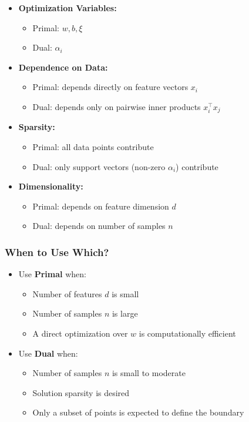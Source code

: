 \documentclass[10pt,a4paper]{article}
\begin{document}
		\begin{itemize}
			\item \textbf{Optimization Variables:}
			\begin{itemize}
				\item Primal: $w, b, \xi$
				\item Dual: $\alpha_i$
			\end{itemize}
	
			\item \textbf{Dependence on Data:}
			\begin{itemize}
				\item Primal: depends directly on feature vectors $x_i$
				\item Dual: depends only on pairwise inner products $x_i^\top x_j$
			\end{itemize}
	
			\item \textbf{Sparsity:}
			\begin{itemize}
				\item Primal: all data points contribute
				\item Dual: only support vectors (non-zero $\alpha_i$) contribute
			\end{itemize}
	
			\item \textbf{Dimensionality:}
			\begin{itemize}
				\item Primal: depends on feature dimension $d$
				\item Dual: depends on number of samples $n$
			\end{itemize}
		\end{itemize}
	
		\vspace{0.5em}
	
		\subsubsection{When to Use Which?}
	
		\begin{itemize}
			\item Use \textbf{Primal} when:
			\begin{itemize}
				\item Number of features $d$ is small
				\item Number of samples $n$ is large
				\item A direct optimization over $w$ is computationally efficient
			\end{itemize}
	
			\item Use \textbf{Dual} when:
			\begin{itemize}
				\item Number of samples $n$ is small to moderate
				\item Solution sparsity is desired
				\item Only a subset of points is expected to define the boundary
			\end{itemize}
		\end{itemize}
\end{document}
